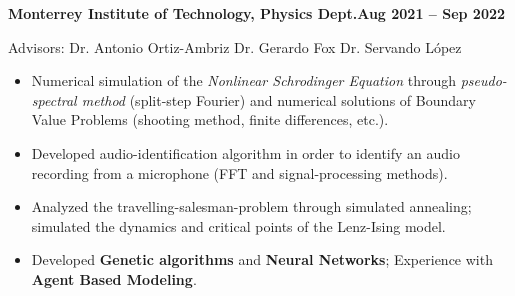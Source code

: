 % 
% 
\textbf{Monterrey Institute of Technology, Physics Dept.}\hfill {\bf Aug 2021 -- Sep 2022}

Advisors: Dr. Antonio Ortiz-Ambriz  Dr. Gerardo Fox  Dr. Servando López 

\begin{itemize}
\setlength{\itemsep}{0.5em}
    \item Numerical simulation of the \emph{Nonlinear Schrodinger Equation} through \emph{pseudo-spectral method} (split-step Fourier) and numerical solutions of Boundary Value Problems (shooting method, finite differences, etc.).
    \item Developed audio-identification algorithm in order to identify an audio recording from a microphone (FFT and signal-processing methods).
    \item Analyzed the travelling-salesman-problem through simulated annealing; simulated the dynamics and critical points of the Lenz-Ising model.
    \item Developed \textbf{Genetic algorithms} and \textbf{Neural Networks}; Experience with \textbf{Agent Based Modeling}.
\end{itemize}
